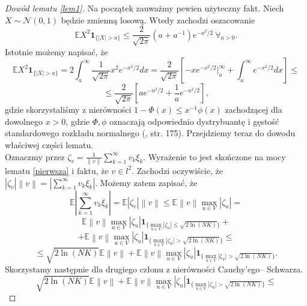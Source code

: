 \documentclass{mwart}
\newcommand{\norm}[1]{\left\lVert#1\right\rVert}
\begin{document}
\begin{proof} [Dowód lematu \ref{lem1}]
Na początek zauważmy pewien użyteczny fakt. Niech $X\sim \mathcal{N}(0,1)$ będzie zmienną losową. Wtedy zachodzi oszacowanie
\begin{displaymath}
\mathbb{E}X^2\pmb{1}_{\{|X|>a\}}\leq \frac{2}{\sqrt{2\pi}}(a+a^{-1})e^{-a^2/2}\ \forall_{a>0}.
\end{displaymath}
Istotnie możemy napisać, że
\begin{displaymath}
\mathbb{E}X^2\pmb{1}_{\{|X|>a\}}=2\int_{a}^{\infty}\frac{1}{\sqrt{2\pi}}x^2e^{-x^2/2}dx=\frac{2}{\sqrt{2\pi}}\left[-xe^{-x^2/2}|_a^{\infty}+\int_a^{\infty}e^{-x^2/2}dx\right]\leq
\end{displaymath}
\begin{displaymath}
\leq \frac{2}{\sqrt{2\pi}}\left[ae^{-a^2/2}+\frac{1}{a}e^{-a^2/2}\right],
\end{displaymath}
gdzie skorzystaliśmy z nierówności $1-\Phi(x)\leq x^{-1}\phi(x)$ zachodzącej dla dowolnego $x>0$, gdzie $\Phi,\phi$ oznaczają odpowiednio dystrybuantę i gęstość standardowego rozkładu normalnego (\cite{feller}, str. 175).
Przejdziemy teraz do dowodu właściwej części lematu.\\
Oznaczmy przez $\zeta_v=\frac{1}{\norm{v}}\sum_{k=1}^{\infty}v_k\xi_k$. Wyrażenie to jest skończone na mocy lematu \ref{pierwsza} i faktu, że $v\in l^2$. Zachodzi oczywiście, że $|\zeta_v|\norm{v}=\left|\sum_{k=1}^{\infty}v_k\xi_k\right|$. Możemy zatem zapisać, że
\begin{displaymath}
\mathbb{E}\left|\sum_{k=1}^{\infty}v_k\xi_k\right|=\mathbb{E}|\zeta_v|\norm{v}\leq \mathbb{E}\norm{v}\max_{u\in V}|\zeta_u|=
\end{displaymath}
\begin{displaymath}
\mathbb{E}\norm{v}\max_{u\in V}|\zeta_u|\pmb{1}_{\{\max_{u\in V}|\zeta_u|\leq \sqrt{2\ln (NK)}\}}+
\end{displaymath}
\begin{displaymath}
+\mathbb{E}\norm{v}\max_{u\in V}|\zeta_u|\pmb{1}_{\{\max_{u\in V}|\zeta_u|> \sqrt{2\ln (NK)}\}}\leq
\end{displaymath}
\begin{displaymath}
\leq \sqrt{2\ln (NK)}\mathbb{E}\norm{v}+\mathbb{E}\norm{v}\max_{u\in V}|\zeta_u|\pmb{1}_{\{\max_{u\in V}|\zeta_u|> \sqrt{2\ln (NK)}\}}.
\end{displaymath}
Skorzystamy następnie dla drugiego członu z nierówności Cauchy'ego-- Schwarza.
\begin{displaymath}
\sqrt{2\ln (NK)}\mathbb{E}\norm{v}+\mathbb{E}\norm{v}\max_{u\in V}|\zeta_u|\pmb{1}_{\{\max_{u\in V}|\zeta_u|> \sqrt{2\ln (NK)}\}}\leq 

\end{displaymath}
\end{proof}
\end{document}
